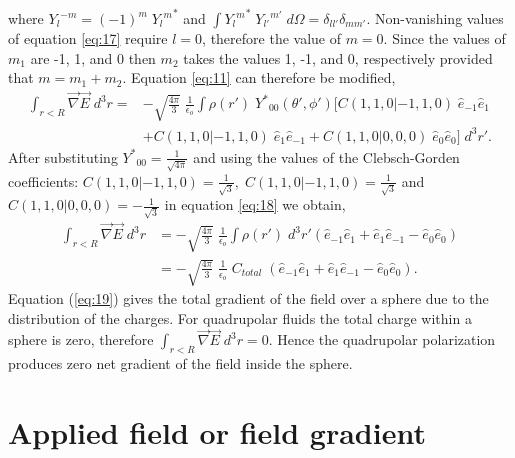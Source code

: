 where ${Y_{l}}^{-m} = (-1)^m\;{{Y_{l}}^{m}}^* $ and
$ \int {{Y_{l}}^{m}}^*\;{Y_{l'}}^{m'}\;d\Omega =
\delta_{ll'}\delta_{mm'} $.
Non-vanishing values of equation \ref{eq:17} require $l = 0$,
therefore the value of $ m = 0 $. Since the values of $ m_1$ are -1,
1, and 0 then $m_2$ takes the values 1, -1, and 0, respectively
provided that $m = m_1 + m_2$.  Equation \ref{eq:11} can therefore be
modified,
\begin{equation}
\begin{split}
\int_{r<R} \vec{\nabla}\vec{E}\;d^3r = &- \sqrt{\frac{4\pi}{{3}}}\;\frac{1}{\epsilon_o}\int \rho(r')\;{Y^*}_{00}(\theta', \phi')[ C(1, 1, 0|-1,1,0)\;{\hat{e}_{-1}}{\hat{e}_{1}}\\  &+ C(1, 1, 0|-1,1,0)\;{\hat{e}_{1}}{\hat{e}_{-1}}+C(
1, 1, 0|0,0,0)\;{\hat{e}_{0}}{\hat{e}_{0}} ]\; d^3r'.
\end{split}
\label{eq:18} 
\end{equation}
After substituting ${Y^*}_{00} = \frac{1}{\sqrt{4\pi}} $ and using the
values of the Clebsch-Gorden coefficients:  $ C(1, 1, 0|-1,1,0) =
\frac{1}{\sqrt{3}}, \;   C(1, 1, 0|-1,1,0)= \frac{1}{\sqrt{3}}$ and $
C(1, 1, 0|0,0,0) = -\frac{1}{\sqrt{3}}$ in equation \ref{eq:18} we
obtain,
\begin{equation}
\begin{split}
\int_{r<R} \vec{\nabla}\vec{E}\;d^3r &= -\sqrt{\frac{4\pi}{{3}}}\;\frac{1}{\epsilon_o}\int \rho(r')\;d^3r'\left({\hat{e}_{-1}}{\hat{e}_{1}}+{\hat{e}_{1}}{\hat{e}_{-1}}-{\hat{e}_{0}}{\hat{e}_{0}}\right)\\
&= - \sqrt{\frac{4\pi}{{3}}}\;\frac{1}{\epsilon_o}\;C_{total}\;\left({\hat{e}_{-1}}{\hat{e}_{1}}+{\hat{e}_{1}}{\hat{e}_{-1}}-{\hat{e}_{0}}{\hat{e}_{0}}\right).
\end{split}
\label{eq:19} 
\end{equation}
Equation (\ref{eq:19}) gives the total gradient of the field over a
sphere due to the distribution of the charges. For quadrupolar fluids
the total charge within a sphere is zero, therefore
$ \int_{r<R} \vec{\nabla}\vec{E}\;d^3r = 0 $.  Hence the quadrupolar
polarization produces zero net gradient of the field inside the
sphere.

\newpage

\section{Applied field or field gradient}
\label{Ap:fieldOrGradient}

